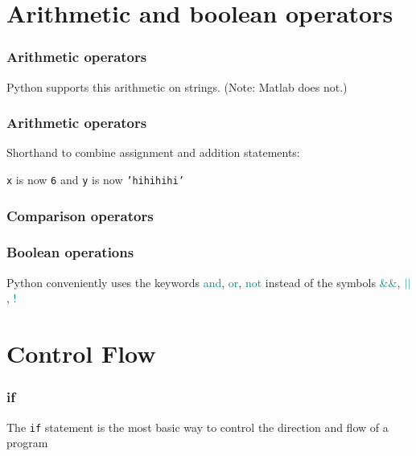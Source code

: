 \documentclass{beamer}
\begin{document}
\section{Arithmetic and boolean operators}

\begin{frame}
\frametitle{Arithmetic operators}



Python supports this arithmetic on strings.  (Note: Matlab does not.)
\end{frame}

\begin{frame}
\frametitle{Arithmetic operators}

Shorthand to combine assignment and addition statements:



\vspace{0.1in}

\texttt{x} is now \texttt{6} and \texttt{y} is now \textcolor{string-color}{\texttt{'hihihihi'}}

\end{frame}


\begin{frame}
\frametitle{Comparison operators}



\end{frame}

\begin{frame}
\frametitle{Boolean operations}



Python conveniently uses the keywords \textcolor{teal}{and}, \textcolor{teal}{or}, \textcolor{teal}{not} instead of the symbols \textcolor{teal}{\&\&}, $\textcolor{teal}{||}$, \textcolor{teal}{!}

\end{frame}

\section{Control Flow}
\begin{frame}
\frametitle{if}
The \texttt{if} statement is the most basic way to control the direction and flow of a program



\end{frame}
\end{document}
